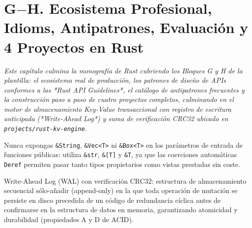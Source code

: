 \documentclass{book}
\begin{document}
\chapter{G\(-\)H. Ecosistema Profesional, Idioms, Antipatrones, Evaluación y 4 Proyectos en Rust}
\label{chap:cap08-ecosistema-herramientas-evaluacion-proyectos-rust}

\noindent\textit{Este capítulo culmina la monografía de Rust cubriendo los Bloques G y H de la plantilla: el ecosistema real de producción, los patrones de diseño de APIs conformes a las *Rust API Guidelines*, el catálogo de antipatrones frecuentes y la construcción paso a paso de cuatro proyectos completos, culminando en el motor de almacenamiento Key-Value transaccional con registro de escritura anticipada (*Write-Ahead Log*) y suma de verificación CRC32 ubicado en \texttt{projects/rust-kv-engine}.}

\begin{tcolorbox}[title={Consejo}, studiumtip, breakable]

Nunca expongas \texttt{\&String}, \texttt{\&Vec<T>} ni \texttt{\&Box<T>} en los parámetros de entrada de funciones públicas: utiliza \texttt{\&str}, \texttt{\&[T]} y \texttt{\&T}, ya que las coerciones automáticas \texttt{Deref} permiten pasar tanto tipos propietarios como vistas prestadas sin coste.
\end{tcolorbox}

\begin{tcolorbox}[title={Definición}, studiumdef, breakable]

Write-Ahead Log (WAL) con verificación CRC32: estructura de almacenamiento secuencial sólo-añadir (append-only) en la que toda operación de mutación se persiste en disco precedida de un código de redundancia cíclica antes de confirmarse en la estructura de datos en memoria, garantizando atomicidad y durabilidad (propiedades A y D de ACID).
\end{tcolorbox}
\end{document}
